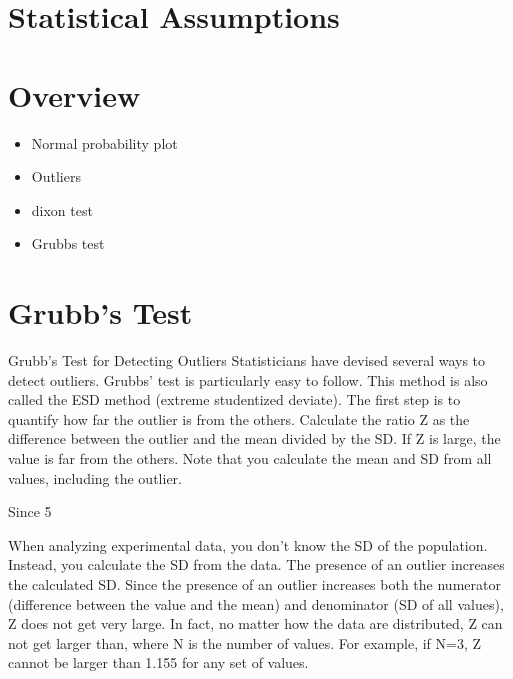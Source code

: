 \section{Statistical Assumptions}

\section{Overview}

\begin{itemize}
\item Normal probability plot \item Outliers \item dixon test
\item Grubbs test
\end{itemize}

\section{Grubb's Test}

Grubb's Test for Detecting Outliers
Statisticians have devised several ways to detect outliers. Grubbs' test is particularly easy to follow. This method is also called the ESD method (extreme studentized deviate).
The first step is to quantify how far the outlier is from the others. Calculate the ratio Z as the difference between the outlier and the mean divided by the SD. If Z is large, the value is far from the others. Note that you calculate the mean and SD from all values, including the outlier.



Since 5%

When analyzing experimental data, you don't know the SD of the population. Instead, you calculate the SD from the data. The presence of an outlier increases the calculated SD. Since the presence of an outlier increases both the numerator (difference between the value and the mean) and denominator (SD of all values), Z does not get very large. In fact, no matter how the data are distributed, Z can not get larger than, where N is the number of values. For example, if N=3, Z cannot be larger than 1.155 for any set of values.

